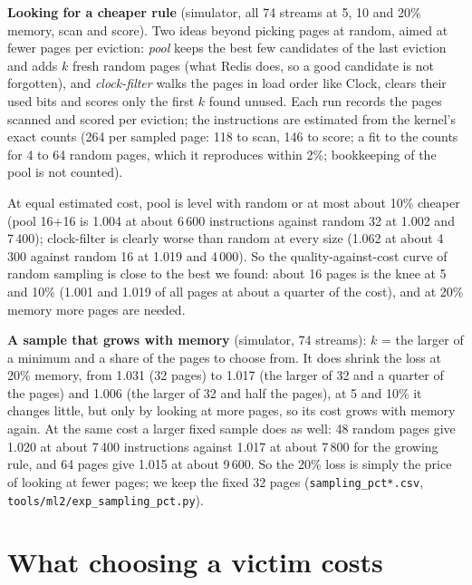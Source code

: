 \documentclass[10.5pt,a4paper]{article}
\newcommand{\code}[1]{\texttt{#1}}
\begin{document}
\textbf{Looking for a cheaper rule} (simulator, all 74 streams at 5, 10 and 20\% memory, scan and score). Two ideas beyond picking pages at random, aimed at fewer pages per eviction:
\emph{pool} keeps the best few candidates of the last eviction and adds $k$ fresh random pages (what Redis does, so a good candidate is not forgotten), and \emph{clock-filter} walks the pages in load order like Clock, clears their
used bits and scores only the first $k$ found unused. Each run records the pages scanned and scored per eviction; the instructions are estimated from the kernel's exact counts (264 per sampled page: 118 to scan, 146 to score; a fit to the counts for 4 to 64 random pages, which it reproduces within 2\%; bookkeeping of the pool is not counted).

\begin{table}[h]
\centering\small
\resizebox{\linewidth}{!}{}
\caption{Faults with sampling divided by faults with all pages (simulator), and the estimated instructions per eviction at 10\% memory.}
\label{tab:more}
\end{table}

At equal estimated cost, pool is level with random or at most about 10\% cheaper (pool 16+16 is 1.004 at about 6\,600 instructions against random 32 at 1.002 and 7\,400); clock-filter is clearly worse than random at every size (1.062 at about 4\,300 against random 16 at 1.019 and 4\,000).
So the quality-against-cost curve of random sampling is close to the best we found: about 16 pages is the knee at 5 and 10\% (1.001 and 1.019 of all pages at about a quarter of the cost), and at 20\% memory more pages are needed.

\textbf{A sample that grows with memory} (simulator, 74 streams): $k$ = the larger of a minimum and a share of the pages to choose from. It does shrink the loss at 20\% memory, from 1.031 (32 pages) to 1.017 (the larger of 32 and a quarter of the pages) and 1.006 (the larger of 32 and half the pages), at 5 and 10\% it changes little, but only by looking at more pages, so its cost grows with memory again. At the same cost a larger fixed sample does as well: 48 random pages give 1.020 at about 7\,400 instructions against 1.017 at about 7\,800 for the growing rule, and 64 pages give 1.015 at about 9\,600. So the 20\% loss is simply the price of looking at fewer pages; we keep the fixed 32 pages (\code{sampling\_pct*.csv}, \code{tools/ml2/exp\_sampling\_pct.py}).

\section{What choosing a victim costs}
\label{sec:cost}
\end{document}
